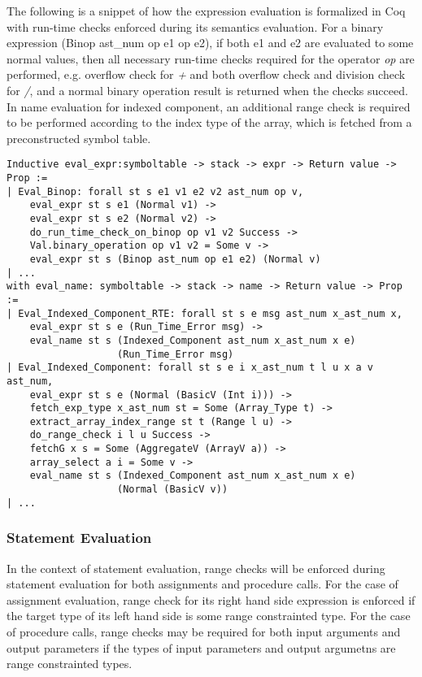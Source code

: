 The following is a snippet of how the expression evaluation is formalized in Coq
with run-time checks enforced during its semantics evaluation. For a binary
expression (Binop ast\_num op e1 op e2), if both e1 and e2 are evaluated to some
normal values, then all necessary run-time checks required for the operator
\textit{op} are performed, e.g. overflow check for \textit{+} and both overflow
check and division check for \textit{/}, and a normal binary operation result is
returned when the checks succeed. In name evaluation for indexed component, an
additional range check is required to be performed according to the index type
of the array, which is fetched from a preconstructed symbol table.

\begin{lstlisting}[escapechar=\#, language=coq, basicstyle=\small]
Inductive eval_expr:symboltable -> stack -> expr -> Return value -> Prop :=
| Eval_Binop: forall st s e1 v1 e2 v2 ast_num op v,
    eval_expr st s e1 (Normal v1) ->
    eval_expr st s e2 (Normal v2) ->
    do_run_time_check_on_binop op v1 v2 Success ->
    Val.binary_operation op v1 v2 = Some v ->
    eval_expr st s (Binop ast_num op e1 e2) (Normal v)
| ...
with eval_name: symboltable -> stack -> name -> Return value -> Prop :=
| Eval_Indexed_Component_RTE: forall st s e msg ast_num x_ast_num x,
    eval_expr st s e (Run_Time_Error msg) ->
    eval_name st s (Indexed_Component ast_num x_ast_num x e) 
                   (Run_Time_Error msg)
| Eval_Indexed_Component: forall st s e i x_ast_num t l u x a v ast_num, 
    eval_expr st s e (Normal (BasicV (Int i))) ->
    fetch_exp_type x_ast_num st = Some (Array_Type t) ->
    extract_array_index_range st t (Range l u) ->
    do_range_check i l u Success ->
    fetchG x s = Some (AggregateV (ArrayV a)) ->
    array_select a i = Some v ->
    eval_name st s (Indexed_Component ast_num x_ast_num x e) 
                   (Normal (BasicV v))
| ...
\end{lstlisting}

\subsubsection{Statement Evaluation}
In the context of statement evaluation, range checks will be enforced during
statement evaluation for both assignments and procedure calls. For the case of
assignment evaluation, range check for its right hand side expression is
enforced if the target type of its left hand side is some range
constrainted type. 
For the case of procedure calls, range checks may be required for both input
arguments and output parameters if the types of input parameters and output
argumetns are range constrainted types.


